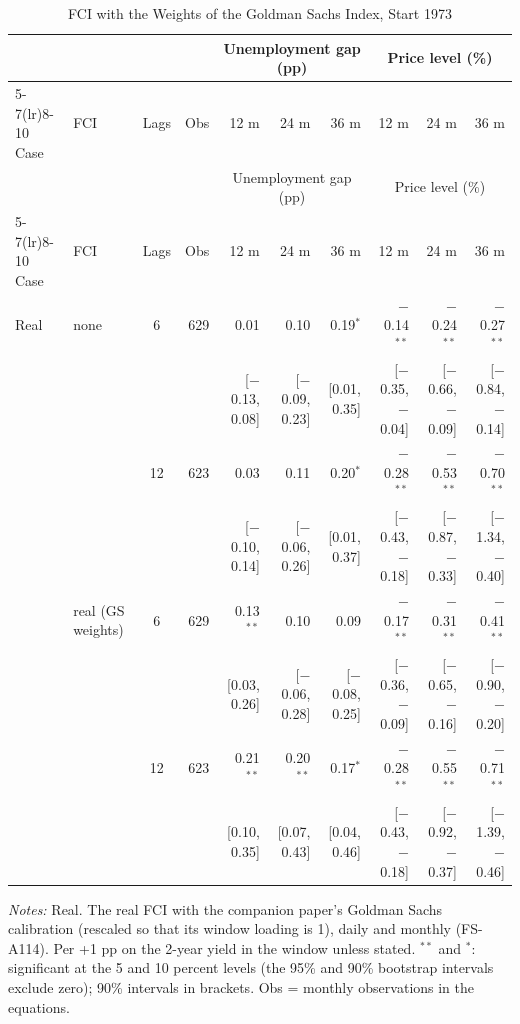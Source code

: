 \begingroup\scriptsize\setlength{\tabcolsep}{0.9pt}
\begin{longtable}{llcrrrrrrr}
\caption{FCI with the Weights of the Goldman Sachs Index, Start 1973}\label{tab:appA573}\\
\toprule
 & & & & \multicolumn{3}{c}{Unemployment gap (pp)} & \multicolumn{3}{c}{Price level (\%)}\\ \cmidrule(lr){5-7}\cmidrule(lr){8-10}
Case & FCI & Lags & Obs & 12 m & 24 m & 36 m & 12 m & 24 m & 36 m\\
\midrule\endfirsthead
\toprule
 & & & & \multicolumn{3}{c}{Unemployment gap (pp)} & \multicolumn{3}{c}{Price level (\%)}\\ \cmidrule(lr){5-7}\cmidrule(lr){8-10}
Case & FCI & Lags & Obs & 12 m & 24 m & 36 m & 12 m & 24 m & 36 m\\
\midrule\endhead
\bottomrule\endfoot
Real & none & 6 & 629 & 0.01 & 0.10 & 0.19$^{*}$ & $-$0.14$^{**}$ & $-$0.24$^{**}$ & $-$0.27$^{**}$\\
 & & & & {\scriptsize [$-$0.13, 0.08]} & {\scriptsize [$-$0.09, 0.23]} & {\scriptsize [0.01, 0.35]} & {\scriptsize [$-$0.35, $-$0.04]} & {\scriptsize [$-$0.66, $-$0.09]} & {\scriptsize [$-$0.84, $-$0.14]}\\
 &  & 12 & 623 & 0.03 & 0.11 & 0.20$^{*}$ & $-$0.28$^{**}$ & $-$0.53$^{**}$ & $-$0.70$^{**}$\\
 & & & & {\scriptsize [$-$0.10, 0.14]} & {\scriptsize [$-$0.06, 0.26]} & {\scriptsize [0.01, 0.37]} & {\scriptsize [$-$0.43, $-$0.18]} & {\scriptsize [$-$0.87, $-$0.33]} & {\scriptsize [$-$1.34, $-$0.40]}\\
 & real (GS weights) & 6 & 629 & 0.13$^{**}$ & 0.10 & 0.09 & $-$0.17$^{**}$ & $-$0.31$^{**}$ & $-$0.41$^{**}$\\
 & & & & {\scriptsize [0.03, 0.26]} & {\scriptsize [$-$0.06, 0.28]} & {\scriptsize [$-$0.08, 0.25]} & {\scriptsize [$-$0.36, $-$0.09]} & {\scriptsize [$-$0.65, $-$0.16]} & {\scriptsize [$-$0.90, $-$0.20]}\\
 &  & 12 & 623 & 0.21$^{**}$ & 0.20$^{**}$ & 0.17$^{*}$ & $-$0.28$^{**}$ & $-$0.55$^{**}$ & $-$0.71$^{**}$\\
 & & & & {\scriptsize [0.10, 0.35]} & {\scriptsize [0.07, 0.43]} & {\scriptsize [0.04, 0.46]} & {\scriptsize [$-$0.43, $-$0.18]} & {\scriptsize [$-$0.92, $-$0.37]} & {\scriptsize [$-$1.39, $-$0.46]}\\
\end{longtable}
\begin{flushleft}\footnotesize\textit{Notes:} Real. The real FCI with the companion paper's Goldman Sachs calibration (rescaled so that its window loading is 1), daily and monthly (FS-A114). Per +1 pp on the 2-year yield in the window unless stated. $^{**}$ and $^{*}$: significant at the 5 and 10 percent levels (the 95\% and 90\% bootstrap intervals exclude zero); 90\% intervals in brackets. Obs = monthly observations in the equations.\end{flushleft}
\endgroup
